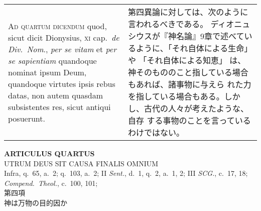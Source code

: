 \documentclass[10pt]{jsarticle} %
\begin{document}
\begin{longtable}{p{21em}p{21em}}
{\scshape Ad quartum dicendum} quod, sicut dicit Dionysius, {\scshape
xi} cap.~{\itshape de Div.~Nom}., {\itshape per se vitam} et {\itshape
per se sapientiam} quandoque nominat ipsum Deum, quandoque virtutes
ipsis rebus datas, non autem quasdam subsistentes res, sicut antiqui
posuerunt.


&

第四異論に対しては、次のように言われるべきである。
ディオニュシウスが『神名論』9章で述べているように、「それ自体による生命」や
 「それ自体による知恵」 は、神そのもののこと指している場合もあれば、諸事物に与えら
 れた力を指している場合もある。しかし、古代の人々が考えたような、自存
 する事物のことを言っているわけではない。

\end{longtable}
\newpage
{}


\begin{center}
 {\Large {\bf ARTICULUS QUARTUS}}\\
 {\large UTRUM DEUS SIT CAUSA FINALIS OMNIUM}\\
 {\footnotesize Infra, q.~65, a.~2; q.~103, a.~2; II {\itshape Sent.},
 d.~1, q.~2, a.~1, 2; III {\itshape SCG.}, c.~17, 18; {\itshape
 Compend.~Theol.}}, c.~100, 101;\\
 {\Large 第四項\\神は万物の目的因か}
\end{center}
\end{document}
